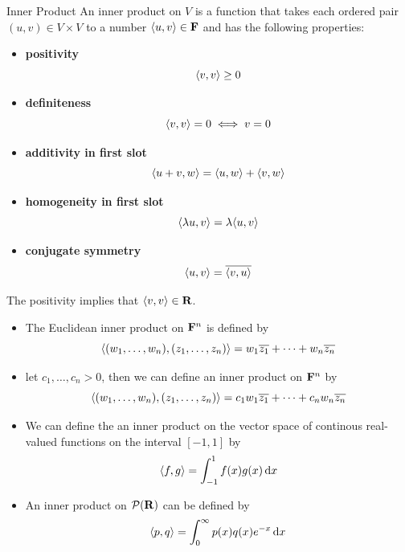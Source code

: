 \documentclass[12pt,a4paper]{article}
\begin{document}
    \begin{defi}{Inner Product}
        An inner product on $V$ is a function that takes each ordered pair $(u,v)\in V\times V$ to a number $\langle u,v\rangle\in\mathbf{F}$ and has the following properties:
        \begin{itemize}
            \item \textbf{positivity}
            $$
            \langle v,v\rangle\geq 0
            $$
            \item \textbf{definiteness}
            $$
            \langle v,v\rangle=0\iff v=0
            $$
            \item \textbf{additivity in first slot}
            $$
            \langle u+v,w\rangle=\langle u,w\rangle+\langle v,w\rangle
            $$
            \item \textbf{homogeneity in first slot}
            $$
            \langle\lambda u,v\rangle=\lambda\langle u,v\rangle
            $$
            \item \textbf{conjugate symmetry}
            $$
            \langle u,v\rangle=\overline{\langle v,u\rangle}
            $$
        \end{itemize}
    \end{defi}
    \begin{remark}
        The positivity implies that $\langle v,v\rangle\in\mathbf{R}$.
    \end{remark}
    \begin{eg}
        \hfill
        
        \begin{itemize}
            \item The Euclidean inner product on $\mathbf{F}^n$ is defined by
            $$
            \langle(w_1,\dots,w_n),(z_1,\dots,z_n)\rangle=w_1\overline{z_1}+\dots+w_n\overline{z_n}
            $$
            \item let $c_1,\dots,c_n>0$, then we can define an inner product on $\mathbf{F}^n$ by
            $$
            \langle(w_1,\dots,w_n),(z_1,\dots,z_n)\rangle=c_1w_1\overline{z_1}+\dots+c_nw_n\overline{z_n}
            $$
            \item We can define the an inner product on the vector space of continous real-valued functions on the interval $[-1,1]$ by
            $$
            \langle f,g\rangle=\int_{-1}^1f(x)g(x)\mathop{}\!\mathrm{d} x
            $$
            \item An inner product on $\mathcal{P}(\mathbf{R})$ can be defined by
            $$
            \langle p,q\rangle=\int_{0}^{\infty}p(x)q(x)e^{-x}\mathop{}\!\mathrm{d} x
            $$
        \end{itemize}
    \end{eg}
    
\end{document}
